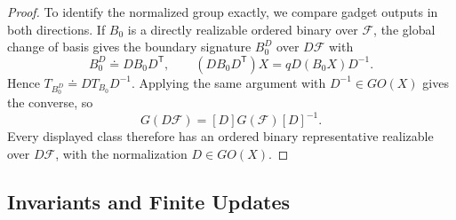 \documentclass[11pt,letterpaper,onecolumn]{article}
\theoremstyle{plain}
\theoremstyle{definition}
\theoremstyle{remark}
\newcommand{\cF}{\mathcal F}
\begin{document}
\begin{proof}
		To identify the normalized group exactly, we compare gadget outputs in
		both directions. If \(B_0\) is a directly realizable ordered binary over
		\(\cF\), the global change of basis gives the boundary signature
		\(B_0^D\) over \(D\cF\) with
		\[
		B_0^D\doteq DB_0D^{\mathsf T},
		\qquad
		(DB_0D^{\mathsf T})X=qD(B_0X)D^{-1}.
		\]
		Hence \(T_{B_0^D}\doteq D T_{B_0}D^{-1}\).  Applying the same argument
		with \(D^{-1}\in GO(X)\) gives the converse, so
		\[
		G(D\cF)=[D]G(\cF)[D]^{-1}.
		\]
        Every displayed class therefore has an ordered binary representative
        realizable over \(D\cF\), with the normalization \(D\in GO(X)\).
	\end{proof}
	
	\subsection{Invariants and Finite Updates}
	\label{sec:odd-residue}
\end{document}
